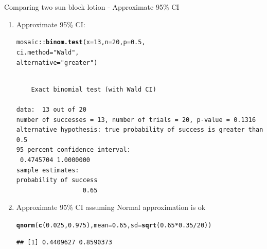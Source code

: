 \documentclass{beamer}\usepackage[]{graphicx}\usepackage[]{color}
\newcommand{\hlnum}[1]{\textcolor[rgb]{0.686,0.059,0.569}{#1}}%
\newcommand{\hlstr}[1]{\textcolor[rgb]{0.192,0.494,0.8}{#1}}%
\newcommand{\hlopt}[1]{\textcolor[rgb]{0,0,0}{#1}}%
\newcommand{\hlstd}[1]{\textcolor[rgb]{0.345,0.345,0.345}{#1}}%
\newcommand{\hlkwc}[1]{\textcolor[rgb]{0.333,0.667,0.333}{#1}}%
\newcommand{\hlkwd}[1]{\textcolor[rgb]{0.737,0.353,0.396}{\textbf{#1}}}%
\newenvironment{knitrout}{}{} %
\begin{document}
\begin{frame}[fragile]{Comparing two sun block lotion - Approximate 95\% CI}
\small
\begin{enumerate}
	\setlength\itemsep{1em}
	
	\item Approximate 95\% CI:
\begin{knitrout}\scriptsize
{}\color{fgcolor}
\begin{alltt}
\hlstd{mosaic}\hlopt{::}\hlkwd{binom.test}\hlstd{(}\hlkwc{x} \hlstd{=} \hlnum{13}\hlstd{,} \hlkwc{n} \hlstd{=} \hlnum{20}\hlstd{,} \hlkwc{p} \hlstd{=} \hlnum{0.5}\hlstd{,}
\hlkwc{ci.method} \hlstd{=} \hlstr{"Wald"}\hlstd{,}
\hlkwc{alternative} \hlstd{=} \hlstr{"greater"}\hlstd{)}
\end{alltt}
\begin{verbatim}

	Exact binomial test (with Wald CI)

data:  13 out of 20
number of successes = 13, number of trials = 20, p-value = 0.1316
alternative hypothesis: true probability of success is greater than 0.5
95 percent confidence interval:
 0.4745704 1.0000000
sample estimates:
probability of success 
                  0.65 
\end{verbatim}

\end{knitrout}
	
		
	\item Approximate 95\% CI assuming Normal approximation is ok 
\begin{knitrout}\scriptsize
{}\color{fgcolor}
\begin{alltt}
\hlkwd{qnorm}\hlstd{(}\hlkwd{c}\hlstd{(}\hlnum{0.025}\hlstd{,} \hlnum{0.975}\hlstd{),} \hlkwc{mean} \hlstd{=} \hlnum{0.65}\hlstd{,} \hlkwc{sd} \hlstd{=} \hlkwd{sqrt}\hlstd{(}\hlnum{0.65}\hlopt{*}\hlnum{0.35} \hlopt{/} \hlnum{20}\hlstd{))}
\end{alltt}
\begin{verbatim}
## [1] 0.4409627 0.8590373
\end{verbatim}

\end{knitrout}
	
\end{enumerate}

\end{frame}
\end{document}
